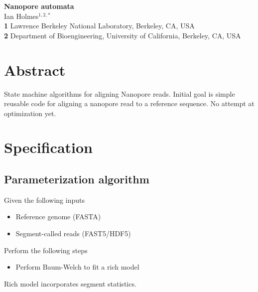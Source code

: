 \documentclass[10pt]{article}
\date{}
\newcommand\titlestring{Nanopore automata}
\newcommand\authorstring{
Ian Holmes$^{1,2,\ast}$
\\
\textbf{1} Lawrence Berkeley National Laboratory, Berkeley, CA, USA
\\
\textbf{2} Department of Bioengineering, University of California, Berkeley, CA, USA
}
\begin{document}
\begin{flushleft}
  {\Large
    \textbf{\titlestring}
  }
\\
\authorstring
\end{flushleft}


\tableofcontents


\section{Abstract}
State machine algorithms for aligning Nanopore reads.
Initial goal is simple reusable code for aligning a nanopore read to a reference sequence.
No attempt at optimization yet.




\section{Specification}

\subsection{Parameterization algorithm}

Given the following inputs
\begin{itemize}
\item Reference genome (FASTA)
\item Segment-called reads (FAST5/HDF5)
\end{itemize}

Perform the following steps
\begin{itemize}
\item Perform Baum-Welch to fit a rich model
\end{itemize}

Rich model incorporates segment statistics.
\end{document}
